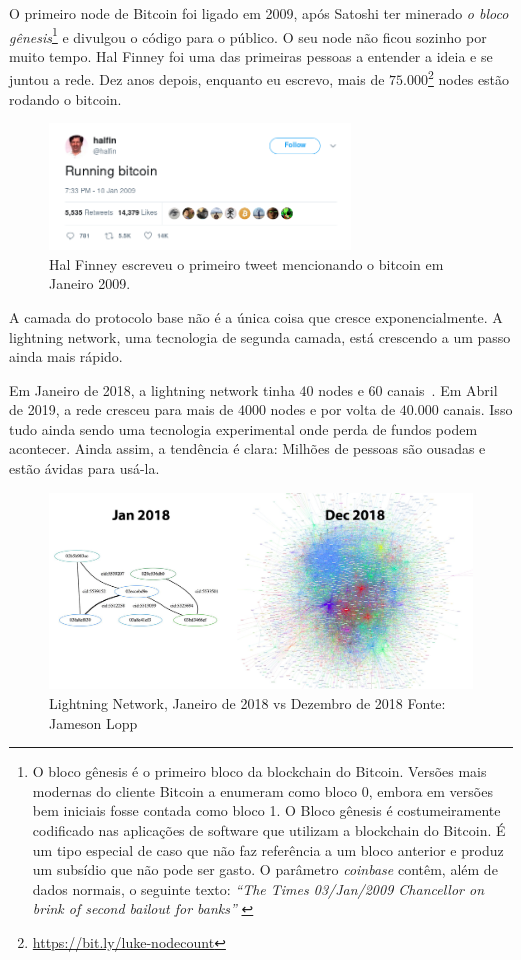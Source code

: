 O primeiro node de Bitcoin foi ligado em 2009, após Satoshi ter minerado 
\textit{o bloco gênesis}\footnote{O bloco gênesis é o primeiro bloco da blockchain do Bitcoin.
  Versões mais modernas do cliente Bitcoin a enumeram como bloco $0$, embora em versões bem iniciais
  fosse contada como bloco 1. O Bloco gênesis é costumeiramente codificado nas aplicações de software 
  que utilizam a blockchain do Bitcoin. É um tipo especial de caso que não faz referência a um bloco anterior 
  e produz um subsídio que não pode ser gasto. O parâmetro \textit{coinbase} contêm, além de dados normais, o seguinte texto:
  \textit{\enquote{The Times 03/Jan/2009 Chancellor on brink of second bailout for banks}} \cite{btcwiki:genesis-block}}
e divulgou o código para o público. O seu node não ficou sozinho por muito tempo. Hal Finney foi uma das primeiras pessoas
a entender a ideia e se juntou a rede. Dez anos depois, enquanto eu escrevo, mais de 
$75.000$\footnote{\url{https://bit.ly/luke-nodecount}} nodes estão rodando o bitcoin.

\begin{figure}
  \centering
  \includegraphics[width=8cm]{assets/images/running-bitcoin.png}
  \caption{Hal Finney escreveu o primeiro tweet mencionando o bitcoin em Janeiro 2009.}
  \label{fig:running-bitcoin}
\end{figure}

A camada do protocolo base não é a única coisa que cresce exponencialmente.
A lightning network, uma tecnologia de segunda camada, está crescendo a um passo ainda mais rápido.

Em Janeiro de 2018, a lightning network tinha $40$ nodes e $60$ canais~\cite{web:lightning-nodes}.
Em Abril de 2019, a rede cresceu para mais de $4000$ nodes e por volta de $40.000$ canais.
Isso tudo ainda sendo uma tecnologia experimental onde perda de fundos podem acontecer. 
Ainda assim, a tendência é clara: Milhões de pessoas são ousadas e estão ávidas para usá-la.

\begin{figure}
  \includegraphics{assets/images/lnd-growth-lopp-white.png}
  \caption{Lightning Network, Janeiro de 2018 vs Dezembro de 2018 Fonte: Jameson Lopp}
  \label{fig:lnd-growth-lopp-white.png}
\end{figure}

